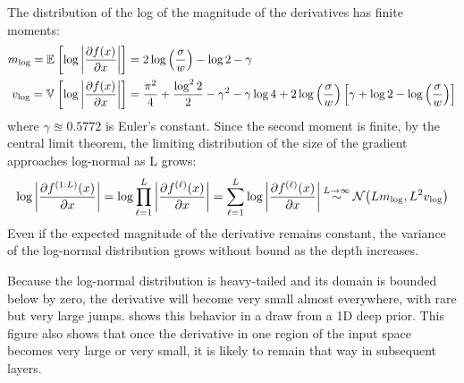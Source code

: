 The distribution of the log of the magnitude of the derivatives has finite moments:
%
\begin{align}
m_{\log} = \mathbb{E}_{} \left[ {\log \left| \frac{\partial f(x)}{\partial x} \right|} \right] & = 2 \log \left( \frac{\sigma}{w} \right) - \log2 - \gamma \nonumber \\
v_{\log} = \mathbb{V}_{} \left[ {\log \left| \frac{\partial f(x)}{\partial x} \right|} \right] & = \frac{\pi^2}{4} + \frac{\log^2 2}{2}  - \gamma^2 - \gamma \log4 + 2 \log\left(\frac{\sigma}{w}\right) \left[ \gamma + \log2 - \log \left(\frac{\sigma}{w}\right) \right]
\end{align}
%
where $\gamma \approxeq 0.5772$ is Euler's constant.  Since the second moment is finite, by the central limit theorem, the limiting distribution of the size of the gradient approaches log-normal as L grows:
%
\begin{align}
\log \left| \frac{\partial f^{(1:L)}(x)}{\partial x} \right| 
 = \log \prod_{\ell=1}^L \left| \frac{\partial f^{(\ell)}(x)}{\partial x} \right| 
 = \sum_{\ell=1}^L \log \left| \frac{\partial f^{(\ell)}(x)}{\partial x} \right| 
\mathbin{\overset{L \rightarrow \infty}{\sim}} \mathcal{N}\!\left( L m_{\log} ,L^2 v_{\log}\right)
\end{align}
%
Even if the expected magnitude of the derivative remains constant, the variance of the log-normal distribution grows without bound as the depth increases.

Because the log-normal distribution is heavy-tailed and its domain is bounded below by zero, the derivative will become very small almost everywhere, with rare but very large jumps.  
 shows this behavior in a draw from a 1D deep \gp{} prior.
This figure also shows that once the derivative in one region of the input space becomes very large or very small, it is likely to remain that way in subsequent layers.
%







